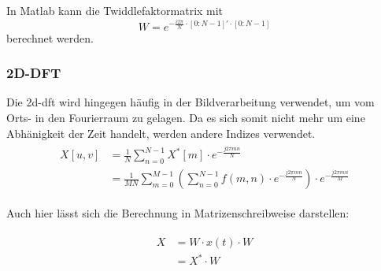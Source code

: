 In Matlab kann die Twiddlefaktormatrix mit
\begin{equation}\label{eq:matlab_dft_faktoren}
 W = e^{-\frac{i 2 \pi}{N}\cdot[0:N-1]'\cdot[0:N-1]}
\end{equation}
berechnet werden.


\subsubsection{2D-DFT}
Die \gls{2d-dft} wird hingegen häufig in der Bildverarbeitung verwendet, um vom Orts- in den Fourierraum zu gelagen. Da es sich somit nicht mehr um eine Abhänigkeit 
der Zeit handelt, werden andere Indizes verwendet.
\begin{align}
\begin{split}
X[u,v] 	&= \frac{1}{N} \sum^{N-1}_{n=0} X^* \left[ m \right] \cdot e^{-\frac{j 2 \pi m n}{N}}\\
	&= \frac{1}{MN} \sum^{M-1}_{m=0} \left( \sum^{N-1}_{n=0} f(m,n) \cdot e^{-\frac{j 2 \pi m n}{N}} \right) \cdot e^{-\frac{j 2 \pi m n}{M}}
\end{split}
\end{align}

Auch hier lässt sich die Berechnung in Matrizenschreibweise darstellen:

\begin{align}
\begin{split}
 X &= W \cdot x\left(t\right) \cdot W \\
                    &= X^* \cdot W
\end{split}
\end{align}


